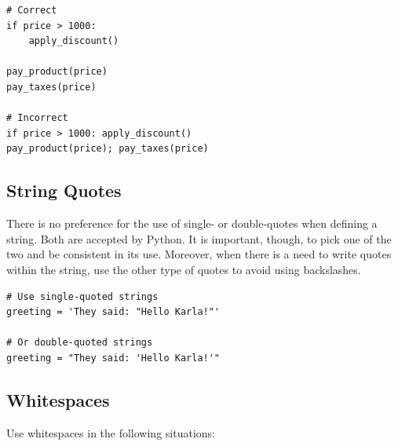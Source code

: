 \documentclass{tufte-handout}
\begin{document}
\begin{mdframed}
\begin{verbatim}
# Correct
if price > 1000:
    apply_discount()

pay_product(price)
pay_taxes(price)

# Incorrect
if price > 1000: apply_discount()
pay_product(price); pay_taxes(price)
\end{verbatim}
\end{mdframed}

\subsection{String Quotes}
There is no preference for the use of single- or double-quotes when defining a string.
Both are accepted by Python.
It is important, though, to pick one of the two and be consistent in its use.
Moreover, when there is a need to write quotes within the string, use the other type of quotes to avoid using backslashes.

\begin{mdframed}
\begin{verbatim}
# Use single-quoted strings
greeting = 'They said: "Hello Karla!"'

# Or double-quoted strings
greeting = "They said: 'Hello Karla!'"

\end{verbatim}
\end{mdframed}


\subsection{Whitespaces}

Use whitespaces in the following situations:
\end{document}
